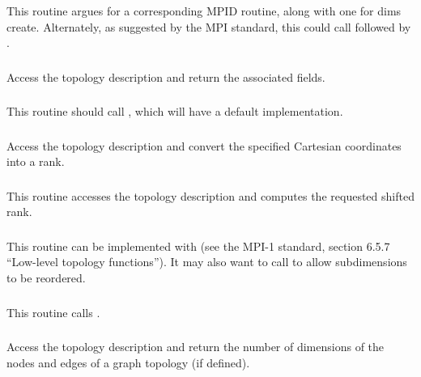 \documentclass{article}
\begin{document}
\subsubsection{}
This routine argues for a corresponding MPID routine, along with one for dims
create. Alternately, as suggested by the MPI standard, this could call
 followed by .

\subsubsection{}
Access the topology description and return the associated fields.

\subsubsection{}
This routine should call , which will have a default
implementation.  

\subsubsection{}
Access the topology description and convert the specified Cartesian
coordinates into a rank.

\subsubsection{}
This routine accesses the topology description and computes the requested
shifted rank.

\subsubsection{}
This routine can be implemented with  (see the MPI-1
standard, section 6.5.7 ``Low-level topology functions'').  It may also
want to call  to allow subdimensions to be reordered.

\subsubsection{}
This routine calls .

\subsubsection{}
Access the topology description and return the number of dimensions of
the nodes and edges of a graph topology (if defined).
\end{document}
